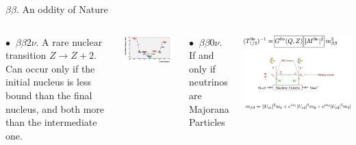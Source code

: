 \documentclass [aspectratio=169]{beamer}
\begin{document}

\begin{frame}{$\beta\beta$. An oddity of Nature}

\begin{columns}

%

$\bullet~$   $\beta\beta2\nu$. A rare nuclear transition $Z \rightarrow Z + 2$. Can occur only if the initial nucleus is less bound than the final nucleus, and both more than the intermediate one.

\includegraphics[scale=0.40]{xebb2nu.png}


$\bullet~$   $\beta\beta0\nu$. If and only if neutrinos are Majorana Particles

 \includegraphics[scale=0.22]{bb0nu.png}
%
%
 
\end{columns}
\end{frame}
\end{document}
